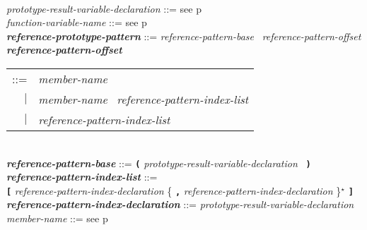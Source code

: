 \documentclass[12pt]{article}
\newcommand{\TT}[1]{{\tt \bfseries #1}}
\newcommand{\STAR}{{\Large $^\star$}}
\newcommand{\emkey}[1]{{\em \bfseries #1}}
\newcommand{\pagref}[1]{p\pageref{#1}}
\newenvironment{indpar}[1][0.3in]%
	{\begin{list}{}%
		     {\setlength{\itemsep}{0in}%
		      \setlength{\topsep}{0in}%
		      \setlength{\parsep}{1ex}%
		      \setlength{\labelwidth}{#1}%
		      \setlength{\leftmargin}{#1}%
		      \addtolength{\leftmargin}{\labelsep}}%
	 \item}%
	{\end{list}}
\begin{document}
\begin{indpar}[0.1in]
\\[0.5ex]
{\em prototype-result-variable-declaration} ::=
    see \pagref{PROTOTYPE-RESULT-VARIABLE-DECLARATION}
\\[0.5ex]
{\em function-variable-name} ::= see \pagref{FUNCTION-VARIABLE-NAME}
\\[0.5ex]
\emkey{reference-prototype-pattern}\label{REFERENCE-PROTOTYPE-PATTERN}
    ::= {\em reference-pattern-base}~ {\em reference-pattern-offset}
\\[0.5ex]
\emkey{reference-pattern-offset}\label{REFERENCE-PATTERN-OFFSET}
    \begin{tabular}[t]{rl}
    ::= & {\em member-name} \\
    $|$ & {\em member-name}~ {\em reference-pattern-index-list} \\
    $|$ & {\em reference-pattern-index-list} \\
    \end{tabular}
\\[0.5ex]
\emkey{reference-pattern-base} ::=
    \TT{(} {\em prototype-result-variable-declaration}~ \TT{)}
\\[0.5ex]
\emkey{reference-pattern-index-list} ::= \\
\hspace*{0.5in}
    \TT{[} {\em reference-pattern-index-declaration}
           \{ \TT{,} {\em reference-pattern-index-declaration} \}\STAR{} \TT{]}
\\[0.5ex]
\emkey{reference-pattern-index-declaration} ::=
    {\em prototype-result-variable-declaration}
\\[0.5ex]
{\em member-name} ::= see \pagref{MEMBER-NAME}
\end{indpar}
\end{document}

